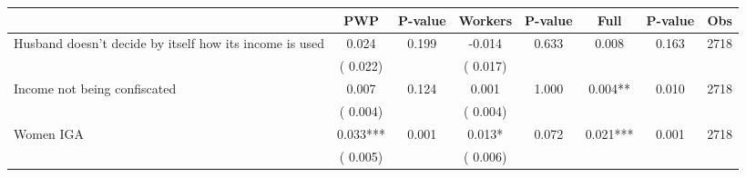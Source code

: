 
\begin{tabular}{l*{7}{c}}\hline&\multicolumn{1}{c}{PWP}&\multicolumn{1}{c}{P-value}&\multicolumn{1}{c}{Workers}&\multicolumn{1}{c}{P-value}&\multicolumn{1}{c}{Full}&\multicolumn{1}{c}{P-value}&\multicolumn{1}{c}{Obs} \\ \hline

 Husband doesn't decide by itself how its income is used       &              0.024       &        0.199  &             -0.014       &        0.633  &              0.008       &              0.163 &  2718 \\ 
                       &       (       0.022)             &                               &       (       0.017)                     &                               &                                               &                                &                      \\ 

 Income not being confiscated       &              0.007       &        0.124  &              0.001       &        1.000  &              0.004**       &              0.010 &  2718 \\ 
                       &       (       0.004)             &                               &       (       0.004)                     &                               &                                               &                                &                      \\ 

 Women IGA       &              0.033***       &        0.001  &              0.013*       &        0.072  &              0.021***       &              0.001 &  2718 \\ 
                       &       (       0.005)             &                               &       (       0.006)                     &                               &                                               &                                &                      \\ 

\hline \end{tabular}